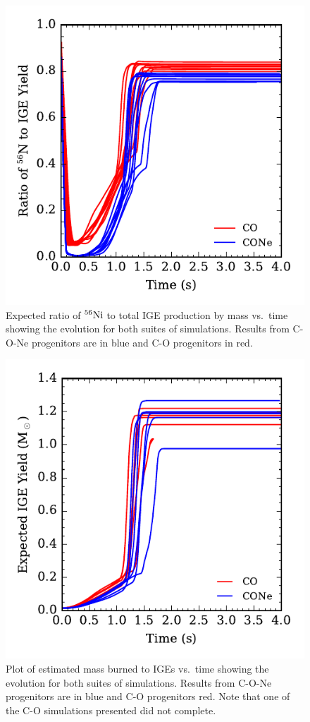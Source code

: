 \documentclass[iop,apj]{emulateapj}
\newcommand{\Ni}[1]{\ensuremath{{}^{#1}{\rm Ni}}}
\begin{document}
\begin{figure}
\includegraphics[width=\columnwidth]{figures/RatioNi56IGE_v_time_plot.pdf}
\caption{\label{fig:compare_ratio}
Expected ratio of \Ni{56} to total IGE production by mass vs.\ time showing the evolution
for both suites of simulations. Results from C-O-Ne progenitors are in blue and C-O progenitors in red.
}
\end{figure}
\begin{figure}
\includegraphics[width=\columnwidth]{figures/MBTI_v_time_plot.pdf}
\caption{\label{fig:compare_burned}
Plot of estimated mass burned to IGEs vs.\ time showing the evolution
for both suites of simulations. Results from C-O-Ne progenitors are
in blue and C-O progenitors red.
Note that one of the C-O simulations presented did not complete.
}
\end{figure}
\end{document}
